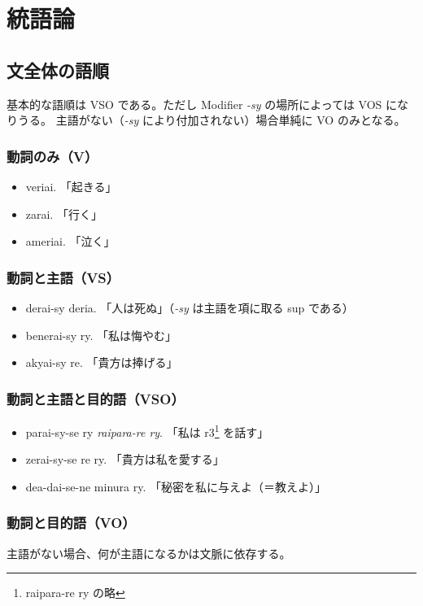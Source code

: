 \section{統語論}

\subsection{文全体の語順}

基本的な語順は VSO である。ただし Modifier \emph{-sy} の場所によっては VOS になりうる。
主語がない（\emph{-sy} により付加されない）場合単純に VO のみとなる。

\subsubsection{動詞のみ（V）}

\begin{itemize}
    \item veriai.   「起きる」
    \item zarai.    「行く」
    \item ameriai.  「泣く」
\end{itemize}

\subsubsection{動詞と主語（VS）}
\begin{itemize}
    \item derai-sy deria.   「人は死ぬ」（\emph{-sy} は主語を項に取る sup である）
    \item benerai-sy ry.    「私は悔やむ」
    \item akyai-sy re.      「貴方は捧げる」
\end{itemize}

\subsubsection{動詞と主語と目的語（VSO）}

\begin{itemize}
    \item parai-sy-se ry \emph{raipara-re ry}. 「私は r3\footnote{raipara-re ry の略} を話す」
    \item zerai-sy-se re ry. 「貴方は私を愛する」
    \item dea-dai-se-ne minura ry. 「秘密を私に与えよ（＝教えよ）」
\end{itemize}

\subsubsection{動詞と目的語（VO）}
主語がない場合、何が主語になるかは文脈に依存する。


